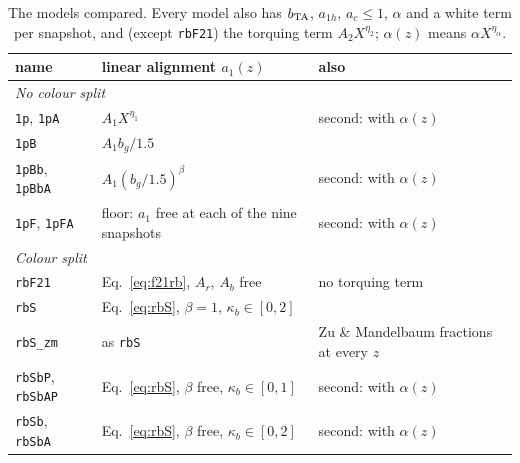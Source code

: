 \documentclass[11pt]{article}
\newcommand{\bTA}{b_{\rm TA}}
\begin{document}
\begin{table}[H]\centering\small
\caption{The models compared. Every model also has $\bTA$, $a_{1h}$,
$a_c \le 1$, $\alpha$ and a white term per snapshot, and (except
\texttt{rbF21}) the torquing term $A_2X^{\eta_2}$; $\alpha(z)$ means
$\alpha X^{\eta_\alpha}$.}
\label{tab:rbmodels}
\setlength{\tabcolsep}{4pt}
\begin{tabular}{p{0.95in}p{3.4in}p{1.6in}}\toprule
name & linear alignment $a_1(z)$ & also\\ \midrule
\multicolumn{3}{l}{\emph{No colour split}}\\
\texttt{1p}, \texttt{1pA} & $A_1X^{\eta_1}$ & second: with $\alpha(z)$\\
\texttt{1pB} & $A_1 b_g/1.5$ & \\
\texttt{1pBb}, \texttt{1pBbA} & $A_1(b_g/1.5)^\beta$ & second: with $\alpha(z)$\\
\texttt{1pF}, \texttt{1pFA} & floor: $a_1$ free at each of the nine snapshots & second: with $\alpha(z)$\\ \midrule
\multicolumn{3}{l}{\emph{Colour split}}\\
\texttt{rbF21} & Eq.~\eqref{eq:f21rb}, $A_r$, $A_b$ free & no torquing term\\
\texttt{rbS} & Eq.~\eqref{eq:rbS}, $\beta = 1$, $\kappa_b \in [0, 2]$ & \\
\texttt{rbS\_zm} & as \texttt{rbS} & Zu \& Mandelbaum fractions at every $z$\\
\texttt{rbSbP}, \texttt{rbSbAP} & Eq.~\eqref{eq:rbS}, $\beta$ free, $\kappa_b \in [0, 1]$ & second: with $\alpha(z)$\\
\texttt{rbSb}, \texttt{rbSbA} & Eq.~\eqref{eq:rbS}, $\beta$ free, $\kappa_b \in [0, 2]$ & second: with $\alpha(z)$\\
\bottomrule\end{tabular}
\end{table}
\end{document}
